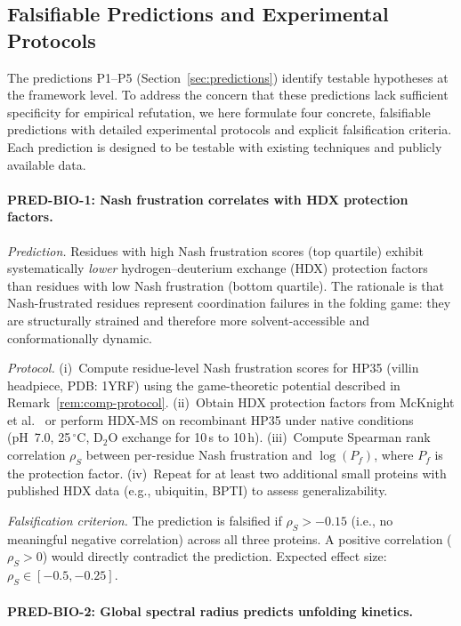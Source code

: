 \documentclass[12pt,a4paper]{article}
\theoremstyle{remark}
\begin{document}
\subsection{Falsifiable Predictions and Experimental Protocols}
\label{sec:falsifiable-predictions}

The predictions P1--P5 (Section~\ref{sec:predictions}) identify testable hypotheses at the framework level. To address the concern that these predictions lack sufficient specificity for empirical refutation, we here formulate four concrete, falsifiable predictions with detailed experimental protocols and explicit falsification criteria. Each prediction is designed to be testable with existing techniques and publicly available data.

\paragraph{PRED-BIO-1: Nash frustration correlates with HDX protection factors.}

\textit{Prediction.}
Residues with high Nash frustration scores (top quartile) exhibit systematically \emph{lower} hydrogen--deuterium exchange (HDX) protection factors than residues with low Nash frustration (bottom quartile). The rationale is that Nash-frustrated residues represent coordination failures in the folding game: they are structurally strained and therefore more solvent-accessible and conformationally dynamic.

\textit{Protocol.}
(i)~Compute residue-level Nash frustration scores for HP35 (villin headpiece, PDB: 1YRF) using the game-theoretic potential described in Remark~\ref{rem:comp-protocol}.
(ii)~Obtain HDX protection factors from McKnight et al.~\cite{McKnight1996} or perform HDX-MS on recombinant HP35 under native conditions (pH~7.0, 25$\,^\circ$C, $\text{D}_2\text{O}$ exchange for 10\,s to 10\,h).
(iii)~Compute Spearman rank correlation $\rho_S$ between per-residue Nash frustration and $\log(P_f)$, where $P_f$ is the protection factor.
(iv)~Repeat for at least two additional small proteins with published HDX data (e.g., ubiquitin, BPTI) to assess generalizability.

\textit{Falsification criterion.}
The prediction is falsified if $\rho_S > -0.15$ (i.e., no meaningful negative correlation) across all three proteins. A positive correlation ($\rho_S > 0$) would directly contradict the prediction. Expected effect size: $\rho_S \in [-0.5, -0.25]$.

\paragraph{PRED-BIO-2: Global spectral radius predicts unfolding kinetics.}
\end{document}
